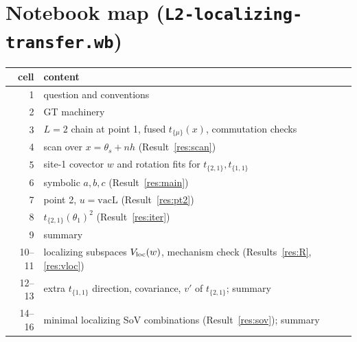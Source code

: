 \documentclass[11pt]{article}
\newcommand{\nb}[1]{\texttt{#1}}
\theoremstyle{definition}
\theoremstyle{remark}
\begin{document}
\section*{Notebook map (\nb{L2-localizing-transfer.wb})}
\begin{center}
\begin{tabular}{rl}\toprule
cell & content\\\midrule
1 & question and conventions\\
2 & GT machinery\\
3 & $L=2$ chain at point 1, fused $t_{\{\mu\}}(x)$, commutation checks\\
4 & scan over $x=\theta_s+nh$ (Result~\ref{res:scan})\\
5 & site-1 covector $w$ and rotation fits for $t_{\{2,1\}},t_{\{1,1\}}$\\
6 & symbolic $a,b,c$ (Result~\ref{res:main})\\
7 & point 2, $u=\mathrm{vacL}$ (Result~\ref{res:pt2})\\
8 & $t_{\{2,1\}}(\theta_1)^2$ (Result~\ref{res:iter})\\
9 & summary\\
10--11 & localizing subspaces $V_{\rm loc}(w)$, mechanism check (Results~\ref{res:R}, \ref{res:vloc})\\
12--13 & extra $t_{\{1,1\}}$ direction, covariance, $v'$ of $t_{\{2,1\}}$; summary\\
14--16 & minimal localizing SoV combinations (Result~\ref{res:sov}); summary\\\bottomrule
\end{tabular}
\end{center}
\end{document}
